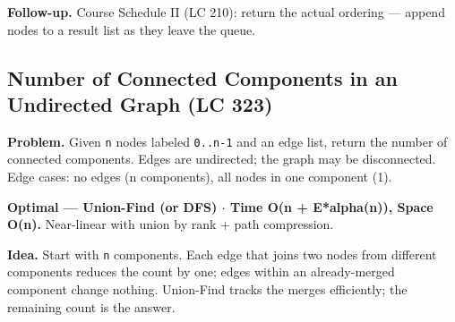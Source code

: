 \documentclass[11pt]{article}
\begin{document}
\textbf{Follow-up.} Course Schedule II (LC 210): return the actual ordering --- append nodes to a result list as they leave the queue.

\subsection{Number of Connected Components in an Undirected Graph (LC 323)}\label{number-of-connected-components-in-an-undirected-graph-lc-323}

\textbf{Problem.} Given \texttt{n} nodes labeled \texttt{0..n-1} and an edge list, return the number of connected components. Edges are undirected; the graph may be disconnected. Edge cases: no edges (n components), all nodes in one component (1).

\textbf{Optimal --- Union-Find (or DFS) \(\cdot\) Time O(n + E*alpha(n)), Space O(n).} Near-linear with union by rank + path compression.

\textbf{Idea.} Start with \texttt{n} components. Each edge that joins two nodes from different components reduces the count by one; edges within an already-merged component change nothing. Union-Find tracks the merges efficiently; the remaining count is the answer.

\end{document}

